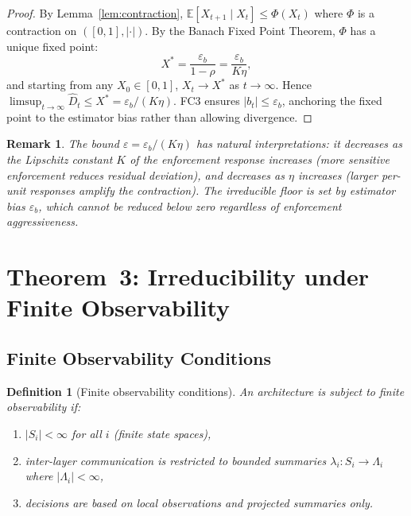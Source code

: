 \documentclass[11pt]{article}
\newtheorem{definition}[theorem]{Definition}
\newtheorem{remark}[theorem]{Remark}
\newcommand{\Dhat}{\widehat{D}}
\newcommand{\State}[1]{S_{#1}}
\newcommand{\Sum}[1]{\lambda_{#1}}
\begin{document}
\begin{proof}
By Lemma~\ref{lem:contraction}, $\mathbb{E}[X_{t+1}\mid X_t] \le \Phi(X_t)$
where $\Phi$ is a contraction on $([0,1], |\cdot|)$.  By the Banach Fixed
Point Theorem, $\Phi$ has a unique fixed point:
\[
  X^* = \frac{\varepsilon_b}{1-\rho} = \frac{\varepsilon_b}{K\eta},
\]
and starting from any $X_0 \in [0,1]$, $X_t \to X^*$ as $t \to \infty$.
Hence $\limsup_{t\to\infty} \Dhat_t \le X^* = \varepsilon_b/(K\eta)$.
FC3 ensures $|b_t| \le \varepsilon_b$, anchoring the fixed point to the
estimator bias rather than allowing divergence.
\end{proof}

\begin{remark}
The bound $\varepsilon = \varepsilon_b / (K\eta)$ has natural interpretations:
it decreases as the Lipschitz constant $K$ of the enforcement response
increases (more sensitive enforcement reduces residual deviation), and
decreases as $\eta$ increases (larger per-unit responses amplify the
contraction). The irreducible floor is set by estimator bias $\varepsilon_b$,
which cannot be reduced below zero regardless of enforcement aggressiveness.
\end{remark}

\section{Theorem~3: Irreducibility under Finite Observability}
\label{sec:thm3}

\subsection{Finite Observability Conditions}

\begin{definition}[Finite observability conditions]
\label{def:finite-obs}
An architecture is subject to \emph{finite observability} if:
\begin{enumerate}[label=(FO\arabic*),noitemsep]
  \item $|\State{i}| < \infty$ for all $i$ (finite state spaces),
  \item inter-layer communication is restricted to bounded summaries
    $\Sum{i}: \State{i} \to \Lambda_i$ where $|\Lambda_i| < \infty$,
  \item decisions are based on local observations and projected summaries only.
\end{enumerate}
\end{definition}
\end{document}
